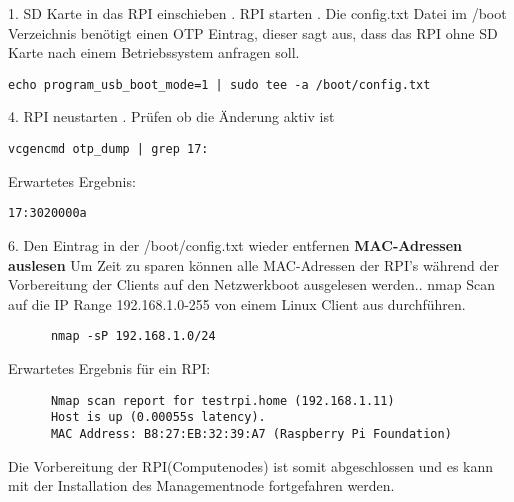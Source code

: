 1. SD Karte in das RPI einschieben . RPI starten . Die config.txt Datei im /boot Verzeichnis benötigt einen OTP Eintrag, dieser sagt aus, dass das RPI ohne SD Karte nach einem Betriebssystem anfragen soll. 
\begin{lstlisting}
echo program_usb_boot_mode=1 | sudo tee -a /boot/config.txt
\end{lstlisting}
4. RPI neustarten . Prüfen ob die Änderung aktiv ist
\begin{lstlisting}
vcgencmd otp_dump | grep 17:
\end{lstlisting}
Erwartetes Ergebnis:
\begin{lstlisting}
17:3020000a
\end{lstlisting}
6. Den Eintrag in der /boot/config.txt wieder entfernen\newline
\textbf{MAC-Adressen auslesen}\newline
Um Zeit zu sparen können alle MAC-Adressen der RPI's während der Vorbereitung der Clients auf den Netzwerkboot ausgelesen werden.. nmap Scan auf die IP Range 192.168.1.0-255 von einem Linux Client aus durchführen.
\begin{lstlisting}
	  nmap -sP 192.168.1.0/24  
\end{lstlisting}
Erwartetes Ergebnis für ein RPI:
\begin{lstlisting}
	  Nmap scan report for testrpi.home (192.168.1.11)
	  Host is up (0.00055s latency).
	  MAC Address: B8:27:EB:32:39:A7 (Raspberry Pi Foundation)   
\end{lstlisting}

Die Vorbereitung der RPI(Computenodes) ist somit abgeschlossen und es kann mit der Installation des Managementnode fortgefahren werden.